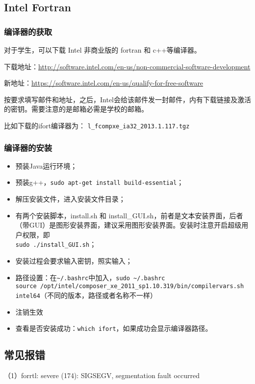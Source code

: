 \subsection{Intel Fortran}
\subsubsection{编译器的获取}
对于学生，可以下载 Intel 非商业版的 fortran 和 c++等编译器。

下载地址：\url{http://software.intel.com/en-us/non-commercial-software-development}

新地址：\url{https://software.intel.com/en-us/qualify-for-free-software}

按要求填写邮件和地址，之后，Intel会给该邮件发一封邮件，内有下载链接及激活的密钥。需要注意的是邮箱必需是学校的邮箱。

比如下载的ifort编译器为：  \verb|l_fcompxe_ia32_2013.1.117.tgz|



\subsubsection{编译器的安装}
\begin{itemize}
\item 预装Java运行环境；
\item 预装g++，\verb*|sudo apt-get install build-essential|；
\item 解压安装文件，进入安装文件目录；
\item 有两个安装脚本，install.sh 和 install\_GUI.sh，前者是文本安装界面，后者（带GUI）是图形安装界面，建议采用图形安装界面。安装时注意开启超级用户权限，即\\
\verb|sudo ./install_GUI.sh|；
\item 安装过程会要求输入密钥，照实输入；
\item 路径设置：在\verb*|~/.bashrc|中加入，\verb|sudo ~/.bashrc|\\
\verb|source /opt/intel/composer_xe_2011_sp1.10.319/bin/compilervars.sh intel64|（不同的版本，路径或者名称不一样）
\item 注销生效
\item 查看是否安装成功：\verb|which ifort|，如果成功会显示编译器路径。
\end{itemize}


\subsection{常见报错}
（1）forrtl: severe (174): SIGSEGV, segmentation fault occurred

